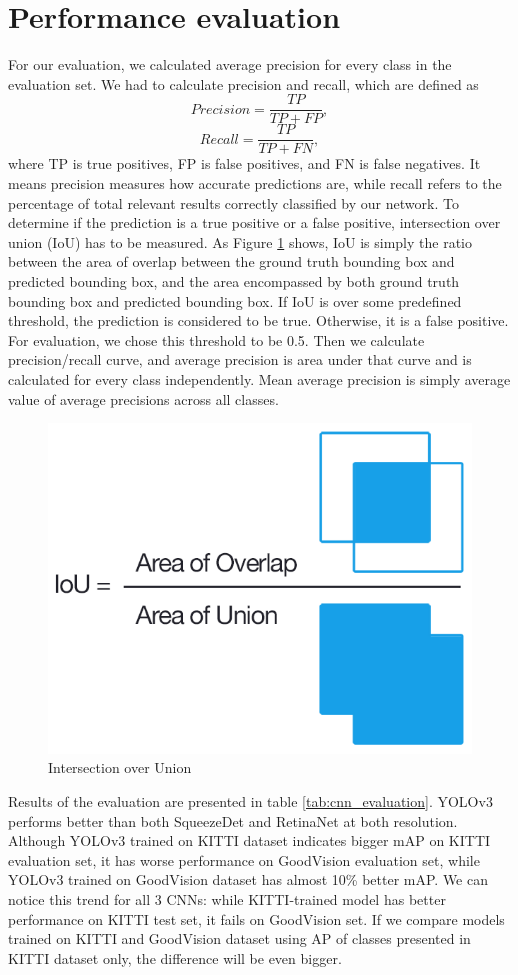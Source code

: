 \documentclass[twoside]{ctuthesis}
\theoremstyle{plain}
\theoremstyle{definition}
\theoremstyle{note}
\begin{document}
\section{Performance evaluation}
For our evaluation, we calculated average precision for every class in the evaluation set. We had to calculate precision and recall, which are defined as
\begin{equation}
Precision = \frac{TP}{TP+FP},
\end{equation}
\begin{equation}
Recall = \frac{TP}{TP+FN},
\end{equation}
where TP is true positives, FP is false positives, and FN is false negatives.
It means precision measures how accurate predictions are, while recall refers to the percentage of total relevant results correctly classified by our network.
To determine if the prediction is a true positive or a false positive, intersection over union (IoU) has to be measured. As Figure \ref{iou} shows, IoU is simply the ratio between the area of overlap between the ground truth bounding box and predicted bounding box, and the area encompassed by both ground truth bounding box and predicted bounding box. If IoU is over some predefined threshold, the prediction is considered to be true. Otherwise, it is a false positive. For evaluation, we chose this threshold to be 0.5.
Then we calculate precision/recall curve\cite{precision_recall_curves}, and average precision is area under that curve and is calculated for every class independently. Mean average precision is simply average value of average precisions across all classes. 
\begin{figure}[h]
\caption{Intersection over Union\cite{pyimagesearch_2018}}
\label{iou}
\includegraphics[width=.4\textwidth]{images/experiments/iou_equation.png}
\end{figure}
Results of the evaluation are presented in table \ref{tab:cnn_evaluation}. YOLOv3 performs better than both SqueezeDet and RetinaNet at both resolution. Although YOLOv3 trained on KITTI dataset indicates bigger mAP on KITTI evaluation set, it has worse performance on GoodVision evaluation set, while YOLOv3 trained on GoodVision dataset has almost 10\% better mAP. We can notice this trend for all 3 CNNs: while KITTI-trained model has better performance on KITTI test set, it fails on GoodVision set. If we compare models trained on KITTI and GoodVision dataset using AP of classes presented in KITTI dataset only, the difference will be even bigger. 
\end{document}
